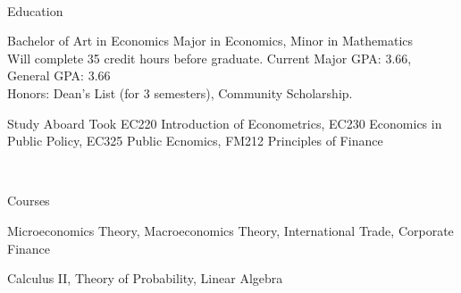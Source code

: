 \documentclass[]{resume-knyte}
\begin{document}



\begin{subheader}{1}
    \\

\end{subheader}

\begin{topic}{Education}


    {Bachelor of Art in Economics}
    {Major in Economics, Minor in Mathematics\\
    Will complete 35 credit hours before graduate. Current Major GPA: 3.66, General GPA: 3.66\\
    Honors: Dean's List (for 3 semesters), Community Scholarship.}


    {Study Aboard}
    {Took EC220 Introduction of Econometrics, EC230 Economics in Public Policy,
    EC325 Public Ecnomics, FM212 Principles of Finance}

    \\ %
\end{topic}

\begin{topic}{Courses}


    {Microeconomics Theory, Macroeconomics Theory, International Trade, Corporate Finance}

    {Calculus II, Theory of Probability, Linear Algebra}
\end{topic}
\end{document}
